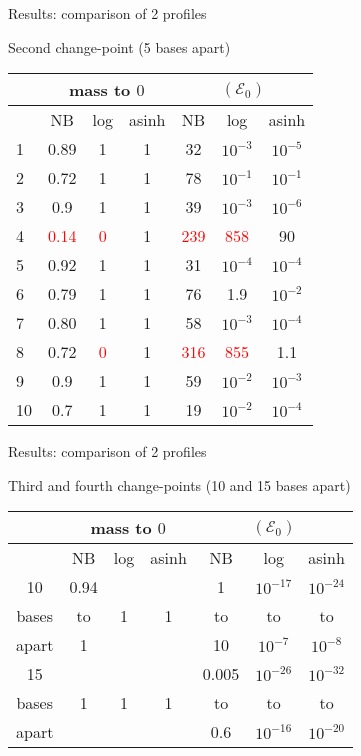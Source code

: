 \documentclass[a4paper]{beamer}
\begin{document}
\begin{frame}{Results: comparison of 2 profiles}
 \begin{center}
Second change-point (5 bases apart)
\begin{table}[h]
\begin{tabular}{l|ccc||ccc}
 & \multicolumn{3}{c||}{mass to $0$} & \multicolumn{3}{c}{$(\mathcal{E}_0)$} \\
  \hline
  &  NB &  log &  asinh & NB & log & asinh\\ 
  \hline
1 & 0.89 & 1 & 1 & 32 & $10^{-3}$ & $10^{-5}$\\
2 & 0.72 & 1 & 1 & 78 & $10^{-1}$ & $10^{-1}$\\
3 & 0.9 & 1 & 1 & 39 & $10^{-3}$ & $10^{-6}$\\
4 & \textcolor{red}{0.14} & \textcolor{red}{0} & 1 & \textcolor{red}{239} & \textcolor{red}{858}& 90\\
5 & 0.92 & 1 & 1 & 31 & $10^{-4}$ & $10^{-4}$\\
6 & 0.79 & 1 & 1 & 76 & 1.9 & $10^{-2}$\\
7 & 0.80 & 1 & 1 & 58 & $10^{-3}$ & $10^{-4}$\\ 
8 & 0.72 & \textcolor{red}{0} & 1 & \textcolor{red}{316} & \textcolor{red}{855} & 1.1\\
9 & 0.9 & 1 & 1 & 59 & $10^{-2}$ & $10^{-3}$\\
10 & 0.7 & 1 & 1 & 19 & $10^{-2}$ & $10^{-4}$ \\
   \hline
\end{tabular}
\end{table}
\end{center}
\end{frame}

\begin{frame}{Results: comparison of 2 profiles}
 \begin{center}
Third and fourth change-points (10 and 15 bases apart)
\begin{table}[h]
\begin{tabular}{c|ccc||ccc}
 & \multicolumn{3}{c||}{mass to $0$} & \multicolumn{3}{c}{$(\mathcal{E}_0)$} \\
  \hline
  &  NB &  log &  asinh & NB & log & asinh\\ 
  \hline
10 & 0.94 &  &  & 1 & $10^{-17}$ & $10^{-24}$\\
bases & to & 1 & 1 & to & to & to\\
apart & 1 &  &  & 10 & $10^{-7}$ & $10^{-8}$\\
\hline
\hline
15 &  &  &  & 0.005 & $10^{-26}$& $10^{-32}$\\
bases & 1 & 1 & 1 & to & to & to\\
apart &  &  &  & 0.6 & $10^{-16}$ & $10^{-20}$\\
   \hline
\end{tabular}
\end{table}
\end{center}
\end{frame}
\end{document}
